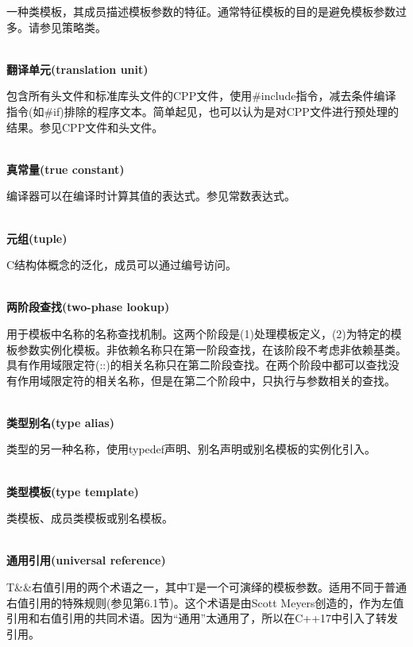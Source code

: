 一种类模板，其成员描述模板参数的特征。通常特征模板的目的是避免模板参数过多。请参见策略类。

\hspace*{\fill} \\ %
\noindent
\textbf{翻译单元(translation unit)}

包含所有头文件和标准库头文件的CPP文件，使用\#include指令，减去条件编译指令(如\#if)排除的程序文本。简单起见，也可以认为是对CPP文件进行预处理的结果。参见CPP文件和头文件。

\hspace*{\fill} \\ %
\noindent
\textbf{真常量(true constant)}

编译器可以在编译时计算其值的表达式。参见常数表达式。

\hspace*{\fill} \\ %
\noindent
\textbf{元组(tuple)}

C结构体概念的泛化，成员可以通过编号访问。

\hspace*{\fill} \\ %
\noindent
\textbf{两阶段查找(two-phase lookup)}

用于模板中名称的名称查找机制。这两个阶段是(1)处理模板定义，(2)为特定的模板参数实例化模板。非依赖名称只在第一阶段查找，在该阶段不考虑非依赖基类。具有作用域限定符(::)的相关名称只在第二阶段查找。在两个阶段中都可以查找没有作用域限定符的相关名称，但是在第二个阶段中，只执行与参数相关的查找。

\hspace*{\fill} \\ %
\noindent
\textbf{类型别名(type alias)}

类型的另一种名称，使用typedef声明、别名声明或别名模板的实例化引入。

\hspace*{\fill} \\ %
\noindent
\textbf{类型模板(type template)}

类模板、成员类模板或别名模板。

\hspace*{\fill} \\ %
\noindent
\textbf{通用引用(universal reference)}

T\&\&右值引用的两个术语之一，其中T是一个可演绎的模板参数。适用不同于普通右值引用的特殊规则(参见第6.1节)。这个术语是由Scott Meyers创造的，作为左值引用和右值引用的共同术语。因为“通用”太通用了，所以在C++17中引入了转发引用。

